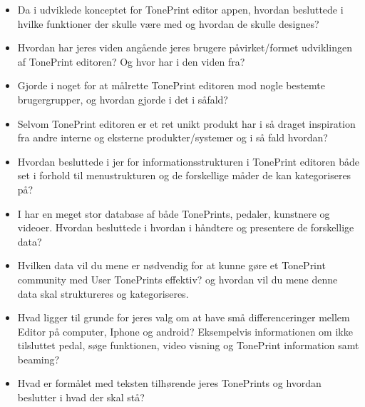 \begin{itemize}
  \item Da i udviklede konceptet for TonePrint editor appen, hvordan besluttede i hvilke funktioner der skulle være med og hvordan de skulle designes? 
  \item Hvordan har jeres viden angående jeres brugere påvirket/formet udviklingen af TonePrint editoren? Og hvor har i den viden fra?
  \item Gjorde i noget for at målrette TonePrint editoren mod nogle bestemte brugergrupper, og hvordan gjorde i det i såfald?
  \item Selvom TonePrint editoren er et ret unikt produkt har i så draget inspiration fra andre interne og eksterne produkter/systemer og i så fald hvordan?
\end{itemize}

\begin{itemize}
  \item Hvordan besluttede i jer for informationsstrukturen i TonePrint editoren både set i forhold til menustrukturen og de forskellige måder de kan kategoriseres på? 
  \item I har en meget stor database af både TonePrints, pedaler, kunstnere og videoer. Hvordan besluttede i hvordan i håndtere og presentere de forskellige data? 
  \item Hvilken data vil du mene er nødvendig for at kunne gøre et TonePrint community med User TonePrints effektiv? og hvordan vil du mene denne data skal struktureres og kategoriseres.
  \item Hvad ligger til grunde for jeres valg om at have små differenceringer mellem Editor på computer, Iphone og android? Eksempelvis informationen om ikke tilsluttet pedal, søge funktionen, video visning og TonePrint information samt beaming?
  \item Hvad er formålet med teksten tilhørende jeres TonePrints og hvordan beslutter i hvad der skal stå?    
\end{itemize}

